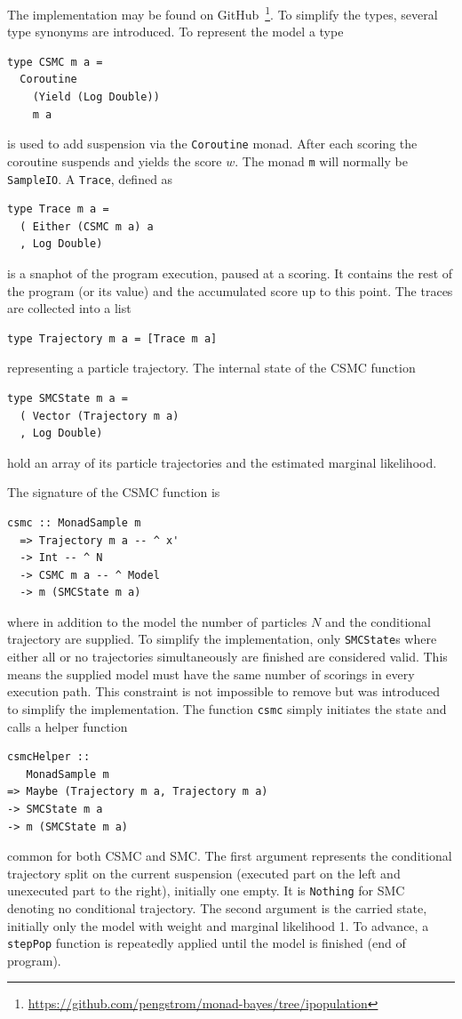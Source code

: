 The implementation may be found on GitHub~\footnote{\url{https://github.com/pengstrom/monad-bayes/tree/ipopulation}}. To simplify the types, several type synonyms are introduced. To represent the model a type
\begin{verbatim}
type CSMC m a =
  Coroutine
    (Yield (Log Double))
    m a
\end{verbatim}
is used to add suspension via the \texttt{Coroutine} monad. After each scoring the coroutine suspends and yields the score $w$. The monad \texttt{m} will normally be \texttt{SampleIO}. A \texttt{Trace}, defined as
\begin{verbatim}
type Trace m a =
  ( Either (CSMC m a) a
  , Log Double)
\end{verbatim}
is a snaphot of the program execution, paused at a scoring. It contains the rest of the program (or its value) and the accumulated score up to this point.
The traces are collected into a list
\begin{verbatim}
type Trajectory m a = [Trace m a]
\end{verbatim}
representing a particle trajectory. The internal state of the CSMC function 
\begin{verbatim}
type SMCState m a =
  ( Vector (Trajectory m a)
  , Log Double)
\end{verbatim}
hold an array of its particle trajectories and the estimated marginal likelihood.

The signature of the CSMC function is
\begin{verbatim}
csmc :: MonadSample m
  => Trajectory m a -- ^ x'
  -> Int -- ^ N
  -> CSMC m a -- ^ Model
  -> m (SMCState m a)
\end{verbatim}
where in addition to the model the number of particles $N$ and the conditional trajectory are supplied. To simplify the implementation, only \texttt{SMCState}s where either all or no trajectories simultaneously are finished are considered valid. This means the supplied model must have the same number of scorings in every execution path. This constraint is not impossible to remove but was introduced to simplify the implementation.
The function \texttt{csmc} simply initiates the state and calls a helper function
\begin{verbatim}
csmcHelper ::
   MonadSample m
=> Maybe (Trajectory m a, Trajectory m a)
-> SMCState m a
-> m (SMCState m a)
\end{verbatim}
common for both CSMC and SMC. The first argument represents the conditional trajectory split on the current suspension (executed part on the left and unexecuted part to the right), initially one empty. It is \texttt{Nothing} for SMC denoting no conditional trajectory. The second argument is the carried state, initially only the model with weight and marginal likelihood 1. To advance, a \texttt{stepPop} function is repeatedly applied until the model is finished (end of program).

